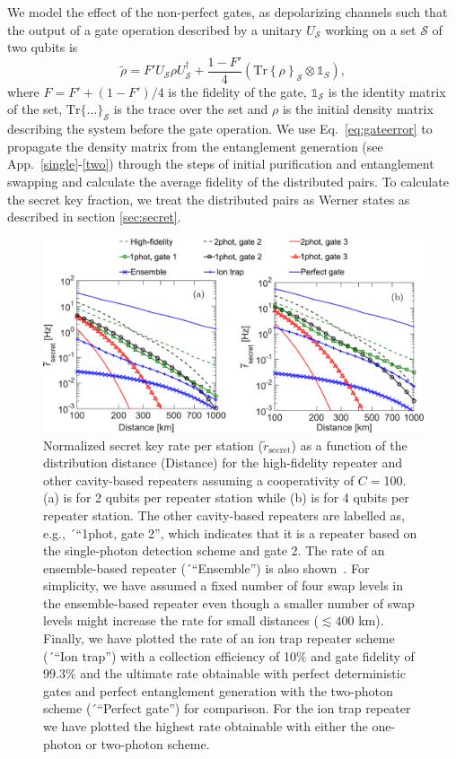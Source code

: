 We model the effect of the non-perfect gates, as depolarizing channels such that
the output of a gate operation described by a unitary $U_{\mathcal{S}}$ working
on a set $\mathcal{S}$ of two qubits is
\begin{equation} \label{eq:gateerror}
\tilde{\rho}=F'U_{\mathcal{S}}\rho
U^{\dagger}_{\mathcal{S}}+\frac{1-F'}{4}\left(\mathrm{Tr}
\left\{\rho\right\}_{\mathcal{S}}\otimes\mathds{1}_{S}\right),
\end{equation}
where $F=F'+(1-F')/4$ is the fidelity of the gate, $\mathds{1}_{\mathcal{S}}$ is
the identity matrix of the set, $\mathrm{Tr}\{\ldots\}_{\mathcal{S}}$ is the
trace over the set and $\rho$ is the initial density matrix describing the system
before the gate operation. We use Eq.~\eqref{eq:gateerror} to propagate the
density matrix from the entanglement generation (see
App.~\ref{single}-\ref{two}) through the steps of initial purification and
entanglement swapping and calculate the average fidelity of the distributed
pairs. To calculate the secret key fraction, we treat the distributed pairs as
Werner states as described in section \ref{sec:secret}.
\begin{figure} [H]
\centering
\includegraphics[width=1\textwidth]{./figs_Borregaard_PRA2015/figureX7}
\caption[Optimal secret key rate I]    
{Normalized secret key rate per station
($\tilde{r}_{\text{secret}}$) as a function of the distribution distance
(Distance) for the high-fidelity repeater and other cavity-based repeaters
assuming a cooperativity of $C=$100. (a) is for 2 qubits per repeater station
while (b) is for 4 qubits per repeater station. The other cavity-based repeaters
are labelled as, e.g., ´``1phot, gate 2'', which indicates that it is a
repeater based on the single-photon detection scheme and gate 2. The rate of an
ensemble-based repeater (´``Ensemble'') is also shown~\cite{sangouard1}. For
simplicity, we have assumed a fixed number of four swap levels in the
ensemble-based repeater even though a smaller number of swap levels might
increase the rate for small distances ($\lesssim400$ km). Finally, we have
plotted the rate of an ion trap repeater scheme (´``Ion trap'') with a
collection efficiency of 10\% and gate fidelity of 99.3\% and the ultimate rate
obtainable with perfect deterministic gates and perfect entanglement generation
with the two-photon scheme (´``Perfect gate'') for comparison. For the ion trap
repeater we have plotted the highest rate obtainable with either the one-photon
or two-photon scheme.}
\label{fig:figureX7}
\end{figure} 
